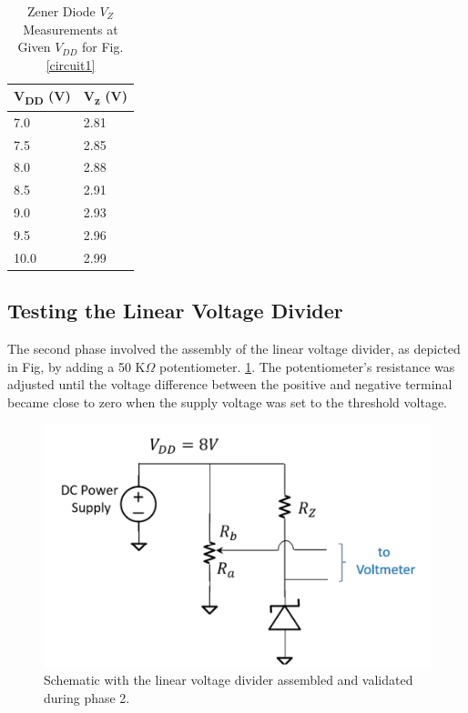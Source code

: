\documentclass[conference]{IEEEtran}
\begin{document}
\begin{table}[htbp]
\caption{Zener Diode $V_Z$ Measurements at Given $V_{DD}$ for Fig. \ref{circuit1}}
\begin{center}
\begin{tabular}{|p{}|p{}|}
\hline
\textbf{V\textsubscript{DD} (V)}&\textbf{V\textsubscript{z} (V)} \\
\hline
7.0 & 2.81 \\ \hline
7.5 & 2.85 \\ \hline
8.0 & 2.88 \\ \hline
8.5 & 2.91 \\ \hline
9.0 & 2.93 \\ \hline
9.5 & 2.96 \\ \hline
10.0 & 2.99 \\ \hline
\end{tabular}
\label{tab1}
\end{center}
\end{table}

\subsection{Testing the Linear Voltage Divider}

The second phase involved the assembly of the linear voltage divider, as depicted in Fig, by adding a 50 K$\Omega$ potentiometer. \ref{circuit2}. The potentiometer's resistance was adjusted until the voltage difference between the positive and negative terminal became close to zero when the supply voltage was set to the threshold voltage.

\begin{figure}[htbp]
\centerline{\includegraphics{./images/circuit2.png}}
\caption{Schematic with the linear voltage divider assembled and validated during phase 2. \cite{week7}}
\label{circuit2}
\end{figure}
\end{document}
